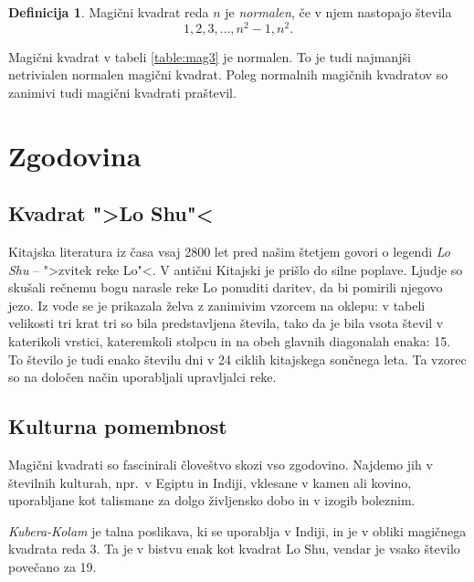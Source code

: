 \documentclass[a4paper,12pt]{article}
\theoremstyle{definition}
\newtheorem{definicija}{Definicija}
\theoremstyle{plain}
\begin{document}
\begin{definicija}
   Magični kvadrat reda \(n\) je \emph{normalen}, če v njem nastopajo števila
   \begin{equation}
      \label{eq:numbers}%
      1, 2, 3, \ldots, n^2-1, n^2.
   \end{equation}
\end{definicija}

Magični kvadrat v tabeli \ref{table:mag3} je normalen.
To je tudi najmanjši netrivialen normalen magični kvadrat.
Poleg normalnih magičnih kvadratov so zanimivi tudi magični kvadrati praštevil. %


\section{Zgodovina}

\subsection{Kvadrat ">Lo Shu"<}

Kitajska literatura iz časa vsaj 2800 let pred našim štetjem govori o legendi
\emph{Lo Shu} -- ">zvitek reke Lo"<. V antični Kitajski je prišlo do
silne poplave. Ljudje so skušali rečnemu bogu narasle reke Lo ponuditi daritev,
da bi pomirili njegovo jezo. Iz vode se je prikazala želva z zanimivim vzorcem
na oklepu: v tabeli velikosti tri krat tri so bila predstavljena števila, tako
da je bila vsota števil v katerikoli vrstici, kateremkoli stolpcu in na obeh
glavnih diagonalah enaka: 15. To število je tudi enako številu dni v 24 ciklih
kitajskega sončnega leta. Ta vzorec so na določen način uporabljali upravljalci
reke.


\subsection{Kulturna pomembnost}

Magični kvadrati so fascinirali človeštvo skozi vso zgodovino. Najdemo jih
v številnih kulturah, npr.\ v Egiptu in Indiji, vklesane v kamen ali
kovino, uporabljane kot talismane za dolgo življensko dobo in v
izogib boleznim.

\emph{Kubera-Kolam} je talna poslikava, ki se uporablja v Indiji, in je v
obliki magičnega kvadrata reda 3. Ta je v bistvu enak kot kvadrat
Lo Shu, vendar je vsako število povečano za 19.
\end{document}

